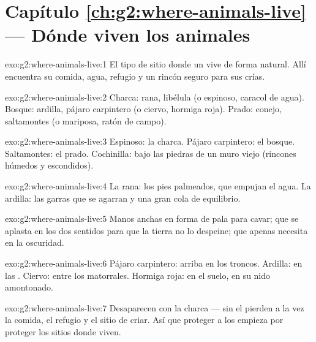 \section*{Capítulo \ref{ch:g2:where-animals-live} --- Dónde viven los animales}

\begin{solution}{exo:g2:where-animals-live:1}
El tipo de sitio donde un  vive de forma natural. Allí encuentra
su comida, agua, refugio y un rincón seguro para sus crías.
\end{solution}

\begin{solution}{exo:g2:where-animals-live:2}
Charca: rana, libélula (o espinoso, caracol de agua). Bosque: ardilla,
pájaro carpintero (o ciervo, hormiga roja). Prado: conejo, saltamontes
(o mariposa, ratón de campo).
\end{solution}

\begin{solution}{exo:g2:where-animals-live:3}
Espinoso: la charca. Pájaro carpintero: el bosque. Saltamontes: el
prado. Cochinilla: bajo las piedras de un muro viejo (rincones
húmedos y escondidos).
\end{solution}

\begin{solution}{exo:g2:where-animals-live:4}
La rana: los pies palmeados, que empujan el agua. La ardilla: las
garras que se agarran y una gran cola de equilibrio.
\end{solution}

\begin{solution}{exo:g2:where-animals-live:5}
Manos anchas en forma de pala para cavar;  que se aplasta en los
dos sentidos para que la tierra no lo despeine;  que apenas
necesita en la oscuridad.
\end{solution}

\begin{solution}{exo:g2:where-animals-live:6}
Pájaro carpintero: arriba en los troncos. Ardilla: en las .
Ciervo: entre los matorrales. Hormiga roja: en el suelo, en su nido
amontonado.
\end{solution}

\begin{solution}{exo:g2:where-animals-live:7}
Desaparecen con la charca --- sin el  pierden a la vez la
comida, el refugio y el sitio de criar. Así que proteger a los
 empieza por proteger los sitios donde viven.
\end{solution}

